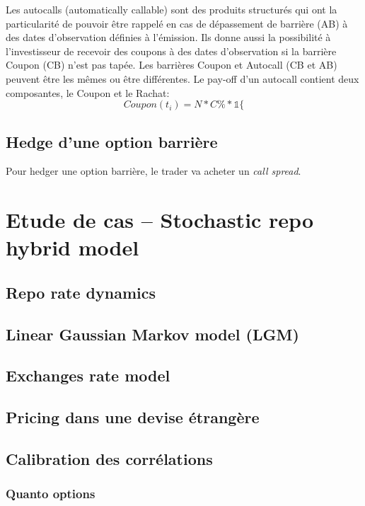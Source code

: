 \documentclass[a4paper]{article}
\begin{document}
Les autocalls (automatically callable) sont des produits structurés qui ont la particularité de pouvoir être rappelé en cas de dépassement de barrière (AB) à des dates d'observation définies à l'émission. Ils donne aussi la possibilité à l'investisseur de recevoir des coupons à des dates d'observation si la barrière Coupon (CB) n'est pas tapée. Les barrières Coupon et Autocall (CB et AB) peuvent être les mêmes ou être différentes. Le pay-off d'un autocall contient deux composantes, le Coupon et le Rachat:
\begin{equation*}
    Coupon(t_i) = N * C\% * \mathbb{1}\{
\end{equation*}

\subsection{Hedge d'une option barrière}

Pour hedger une option barrière, le trader va acheter un \textit{call spread}.

\section{Etude de cas -- Stochastic repo hybrid model}

\subsection{Repo rate dynamics}

\subsection{Linear Gaussian Markov model (LGM)}

\subsection{Exchanges rate model}

\subsection{Pricing dans une devise étrangère}

\subsection{Calibration des corrélations}

\subsubsection{Quanto options}
\end{document}
